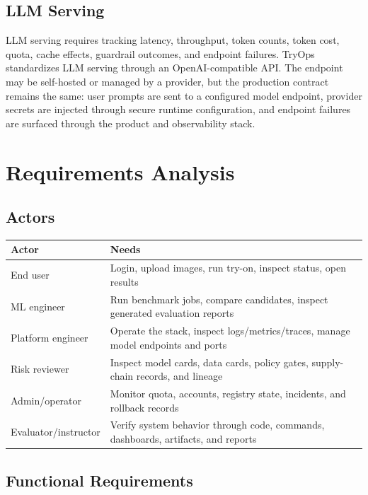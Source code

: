 \documentclass[12pt,a4paper,oneside]{report}
\begin{document}
\section{LLM Serving}

LLM serving requires tracking latency, throughput, token counts, token cost, quota, cache effects, guardrail outcomes, and endpoint failures. TryOps standardizes LLM serving through an OpenAI-compatible API. The endpoint may be self-hosted or managed by a provider, but the production contract remains the same: user prompts are sent to a configured model endpoint, provider secrets are injected through secure runtime configuration, and endpoint failures are surfaced through the product and observability stack.

\chapter{Requirements Analysis}

\section{Actors}

\begin{longtable}{p{4.2cm}p{10.5cm}}
\toprule
\textbf{Actor} & \textbf{Needs} \\
\midrule
End user & Login, upload images, run try-on, inspect status, open results \\
ML engineer & Run benchmark jobs, compare candidates, inspect generated evaluation reports \\
Platform engineer & Operate the stack, inspect logs/metrics/traces, manage model endpoints and ports \\
Risk reviewer & Inspect model cards, data cards, policy gates, supply-chain records, and lineage \\
Admin/operator & Monitor quota, accounts, registry state, incidents, and rollback records \\
Evaluator/instructor & Verify system behavior through code, commands, dashboards, artifacts, and reports \\
\bottomrule
\end{longtable}

\section{Functional Requirements}
\end{document}
